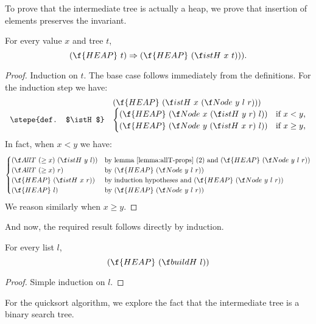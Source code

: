 \documentclass[a4paper,11pt]{llncs}
\begin{document}
To prove that the intermediate tree is actually a heap,
we prove that insertion of elements preserves the invariant.

\begin{proposition}
For every value $x$ and tree $t$,
\[ (\f{HEAP}\ t) \Rightarrow (\f{HEAP}\ (\istH\ x\ t))). \]
\end{proposition}
\begin{proof}
  Induction on $t$. The base case follows immediately from the
  definitions. For the induction step we have:
\[
  \begin{array}{rl}
    & (\f{HEAP}\ (\istH\ x\ (\Node\ y\ l\ r))) \\
    \stepe{def. $\istH$}
    & 
    \begin{cases}
      (\f{HEAP}\ (\Node\ x\ (\istH\ y\ r)\ l))
      & \text{if $x<y$,}\\
      (\f{HEAP}\ (\Node\ y\ (\istH\ x\ r)\ l))
      & \text{if $x\geq y$,}\\
    \end{cases}
  \end{array}
\]
\noindent In fact, when $x<y$ we have:
\[
\begin{cases}
  (\AllT\ (\geq x)\ (\istH\ y\ l))
  &\text{by lemma \ref{lemma:allT-props} (2) and $(\f{HEAP}\ (\Node\ y\
    l\ r))$} \\
  (\AllT\ (\geq x)\ r)
  &\text{by $(\f{HEAP}\ (\Node\ y\ l\ r))$} \\
  (\f{HEAP}\ (\istH\ x\ r))
  &\text{by induction hypotheses and $(\f{HEAP}\ (\Node\ y\ l\ r))$} \\
  (\f{HEAP}\ l)
  &\text{by $(\f{HEAP}\ (\Node\ y\ l\ r))$}
\end{cases}
\]
\noindent We reason similarly when $x\geq y$.
\end{proof}

And now, the required result follows directly by induction.

\begin{corollary}
\label{prop:buildh}
For every list $l$,
\[ (\f{HEAP}\ (\buildH\ l)) \]
\end{corollary}
\begin{proof}
  Simple induction on $l$.
\end{proof}

For the quicksort algorithm, we explore the fact that the intermediate
tree is a binary search tree.
\end{document}
